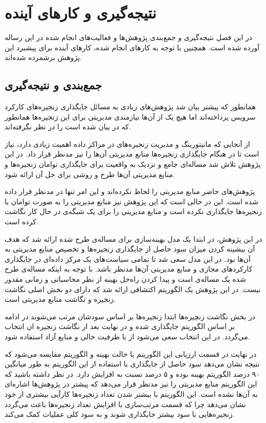 \chapter{نتیجه‌گیری و کارهای آینده}

در این فصل نتیجه‌گیری و جمع‌بندی پژوهش‌ها و فعالیت‌های انجام شده
در این رساله آورده شده است.
همچنین با توجه به کارهای انجام شده،
کارهای آینده برای پیشبرد این پژوهش برشمرده شده‌اند.

\section{جمع‌بندی و نتیجه‌گیری}

همانطور که پیشتر بیان شد پژوهش‌های زیادی به مسائل جایگذاری
زنجیره‌های کارکرد سرویس پرداخته‌اند
اما هیچ یک از آن‌ها نیازمندی مدیریتی برای این زنجیره‌ها همانطور که در
\cite{ETSI-MAN}
بیان شده است را در نظر نگرفته‌اند.

از آنجایی که مانیتورینگ و مدیریت زنجیره‌های در مراکز داده اهمیت زیادی دارد،
نیاز است تا در هنگام جایگذاری زنجیره‌ها منابع مدیریتی آن‌ها را نیز مدنظر قرار داد.
در این پژوهش تلاش شد مساله‌ای جامع و نزدیک به واقعیت برای جایگذاری توامان زنجیره‌ها و منابع مدیریتی
آن‌ها طرح و روشی برای حل آن ارائه شود.

پژوهش‌های حاضر منابع مدیریتی را لحاظ نکرده‌اند و این امر تنها در \cite{AbuLebdeh2017}
مدنظر قرار داده شده است.
این در حالی است که این پژوهش نیز منابع مدیریتی را به صورت توامان با زنجیره‌ها جایگذاری نکرده است
و منابع مدیریتی را برای یک شبگه‌ی در حال کار نگاشت کرده است.

در این پژوهش، در ابتدا یک مدل بهینه‌سازی
برای مساله‌ی طرح شده ارائه شد که هدف آن بیشینه کردن میزان سود حاصل از جایگذاری زنجیره‌ها
و تخصیص منابع مدیریتی به آن‌ها بود.
در این مدل سعی شد تا تمامی سیاست‌های یک مرکز داده‌ای در جایگذاری کارکردهای مجازی
و منابع مدیریتی آن‌ها مدنظر باشد.
با توجه به اینکه مساله‌ی طرح شده یک مساله‌ی 
است و پیدا کردن راه‌حل بهینه از نظر محاسباتی
و زمانی مقدور نیست.
در این پژوهش یک الگوریتم اکتشافی ارائه شد که دارای دو بخش اصلی
نگاشت زنجیره و نگاشت منابع مدیریتی است.

در بخش نگاشت زنچیره‌ها ابتدا زنجیره‌ها بر اساس سودشان مرتب می‌شوند
در ادامه بر اساس الگوریتم
\cite{Bari2015}
جایگذاری شده و در نهایت بعد از نگاشت زنجیره
ان انتخاب می‌گردد. در این انتخاب سعی می‌شود از 
با ظرفیت خالی و منابع آزاد استفاده شود.

در نهایت در قسمت ارزیابی این الگوریتم با حالت بهینه و الگوریتم
\cite{Bari2015}
مقایسه می‌شود که نتیجه نشان می‌دهد سود حاصل از جایگذاری با استفاده از این الگوریتم
به طور میانگین ۹۰ درصد الگوریتم بهینه بوده و ۵ درصد نسبت به \cite{Bari2015}
افزایش دارد.
در نظر داشته باشید که این الگوریتم منابع مدیریتی را نیز مدنظر قرار می‌دهد
که پیشتر در پژوهش‌ها اشاره‌ای به آن‌ها نشده است.
این الگوریتم با بیشتر شدن تعداد زنجیره‌ها کارآیی بیشتری از خود نشان می‌دهد
چرا که قسمت مرتب‌سازی با افزایش تعداد زنجیره‌ها باعث می‌گردد زنجیره‌هایی با سود بیشتر جایگذاری شوند و به سود کلی عملیات کمک می‌کند.

